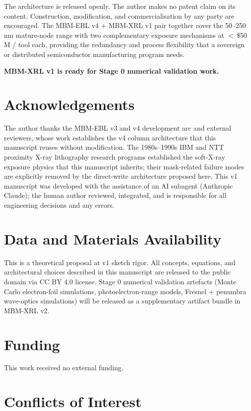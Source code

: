 \documentclass[11pt,letterpaper]{article}
\begin{document}
The architecture is released openly. The author makes no patent claim on its content. Construction, modification, and commercialisation by any party are encouraged. The MBM-EBL v4 + MBM-XRL v1 pair together cover the 50--250\,nm mature-node range with two complementary exposure mechanisms at $<$\,\$50\,M / tool each, providing the redundancy and process flexibility that a sovereign or distributed semiconductor manufacturing program needs.

\textbf{MBM-XRL v1 is ready for Stage 0 numerical validation work.}

\section*{Acknowledgements}

The author thanks the MBM-EBL v3 and v4 development arc and external reviewers, whose work establishes the v4 column architecture that this manuscript reuses without modification. The 1980s--1990s IBM and NTT proximity X-ray lithography research programs established the soft-X-ray exposure physics that this manuscript inherits; their mask-related failure modes are explicitly removed by the direct-write architecture proposed here. This v1 manuscript was developed with the assistance of an AI subagent (Anthropic Claude); the human author reviewed, integrated, and is responsible for all engineering decisions and any errors.

\section*{Data and Materials Availability}

This is a theoretical proposal at v1 sketch rigor. All concepts, equations, and architectural choices described in this manuscript are released to the public domain via CC BY 4.0 license. Stage 0 numerical validation artefacts (Monte Carlo electron-foil simulations, photoelectron-range models, Fresnel + penumbra wave-optics simulations) will be released as a supplementary artifact bundle in MBM-XRL v2.

\section*{Funding}

This work received no external funding.

\section*{Conflicts of Interest}
\end{document}

